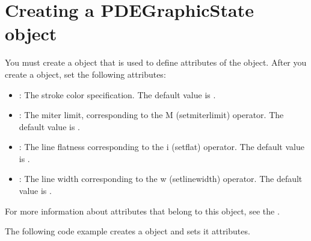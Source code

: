 \documentclass[letterpaper,12pt,english,openany,oneside]{sphinxmanual}
\begin{document}
\section{Creating a PDEGraphicState object}
\label{\detokenize{Plugins_Insertext:creating-a-pdegraphicstate-object}}
You must create a  object that is used to define attributes of the  object. After you create a  object, set the following attributes:
\begin{itemize}
\item {} 
: The stroke color specification. The default value is .

\item {} 
: The miter limit, corresponding to the M (setmiterlimit) operator. The default value is .

\item {} 
: The line flatness corresponding to the i (setflat) operator. The default value is .

\item {} 
: The line width corresponding to the w (setlinewidth) operator. The default value is .

\end{itemize}

For more information about attributes that belong to this object, see the .

The following code example creates a  object and sets it attributes.

\begin{sphinxVerbatim}[commandchars=\\\{\}]
       
 
   
  
    
  
  
  
\end{sphinxVerbatim}
\end{document}
